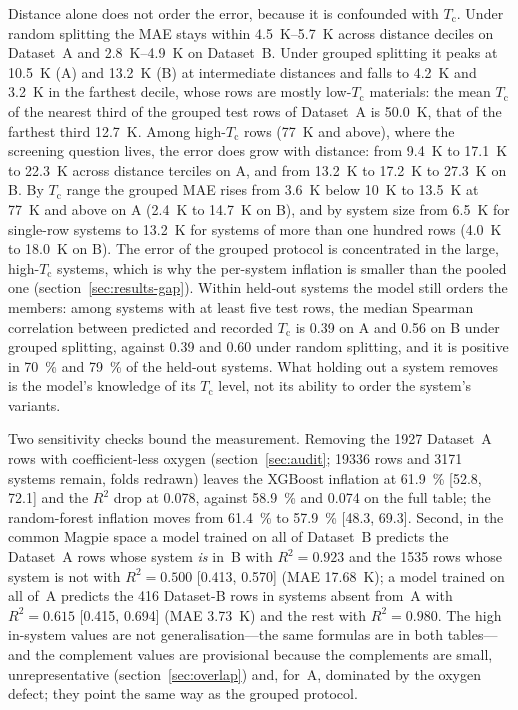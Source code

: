 \documentclass{iopjournal}
\newcommand{\Tc}{T_{\mathrm c}}
\newcommand{\Rsq}{R^{2}}
\newcommand{\ci}[2]{[\num{#1}, \num{#2}]}
\begin{document}
Distance alone does not order the error, because it is confounded with $\Tc$. Under random splitting the MAE stays within \SIrange{4.5}{5.7}{\kelvin} across distance deciles on Dataset~A and \SIrange{2.8}{4.9}{\kelvin} on Dataset~B. Under grouped splitting it peaks at \SI{10.5}{\kelvin} (A) and \SI{13.2}{\kelvin} (B) at intermediate distances and falls to \SI{4.2}{\kelvin} and \SI{3.2}{\kelvin} in the farthest decile, whose rows are mostly low-$\Tc$ materials: the mean $\Tc$ of the nearest third of the grouped test rows of Dataset~A is \SI{50.0}{\kelvin}, that of the farthest third \SI{12.7}{\kelvin}. Among high-$\Tc$ rows (77~K and above), where the screening question lives, the error does grow with distance: from \SI{9.4}{\kelvin} to \SI{17.1}{\kelvin} to \SI{22.3}{\kelvin} across distance terciles on A, and from \SI{13.2}{\kelvin} to \SI{17.2}{\kelvin} to \SI{27.3}{\kelvin} on B. By $\Tc$ range the grouped MAE rises from \SI{3.6}{\kelvin} below 10~K to \SI{13.5}{\kelvin} at 77~K and above on A (\SI{2.4}{\kelvin} to \SI{14.7}{\kelvin} on B), and by system size from \SI{6.5}{\kelvin} for single-row systems to \SI{13.2}{\kelvin} for systems of more than one hundred rows (\SI{4.0}{\kelvin} to \SI{18.0}{\kelvin} on B). The error of the grouped protocol is concentrated in the large, high-$\Tc$ systems, which is why the per-system inflation is smaller than the pooled one (section~\ref{sec:results-gap}). Within held-out systems the model still orders the members: among systems with at least five test rows, the median Spearman correlation between predicted and recorded $\Tc$ is \num{0.39} on A and \num{0.56} on B under grouped splitting, against \num{0.39} and \num{0.60} under random splitting, and it is positive in \SI{70}{\percent} and \SI{79}{\percent} of the held-out systems. What holding out a system removes is the model's knowledge of its $\Tc$ level, not its ability to order the system's variants.

Two sensitivity checks bound the measurement. Removing the \num{1927} Dataset~A rows with
coefficient-less oxygen (section~\ref{sec:audit}; \num{19336} rows and \num{3171} systems remain,
folds redrawn) leaves the XGBoost inflation at \SI{61.9}{\percent} \ci{52.8}{72.1} and the
$\Rsq$ drop at \num{0.078}, against \SI{58.9}{\percent} and \num{0.074} on the full table; the
random-forest inflation moves from \SI{61.4}{\percent} to \SI{57.9}{\percent} \ci{48.3}{69.3}.
Second, in the common Magpie space a model trained on all of Dataset~B predicts the Dataset~A rows
whose system \emph{is} in~B with $\Rsq = \num{0.923}$ and the \num{1535} rows whose system is not
with $\Rsq = \num{0.500}$ \ci{0.413}{0.570} (MAE \SI{17.68}{\kelvin}); a model trained on all of~A
predicts the \num{416} Dataset-B rows in systems absent from~A with $\Rsq = \num{0.615}$
\ci{0.415}{0.694} (MAE \SI{3.73}{\kelvin}) and the rest with $\Rsq = \num{0.980}$. The
high in-system values are not generalisation---the same formulas are in both tables---and the
complement values are provisional because the complements are small, unrepresentative
(section~\ref{sec:overlap}) and, for~A, dominated by the oxygen defect; they point the same way as
the grouped protocol.
\end{document}
